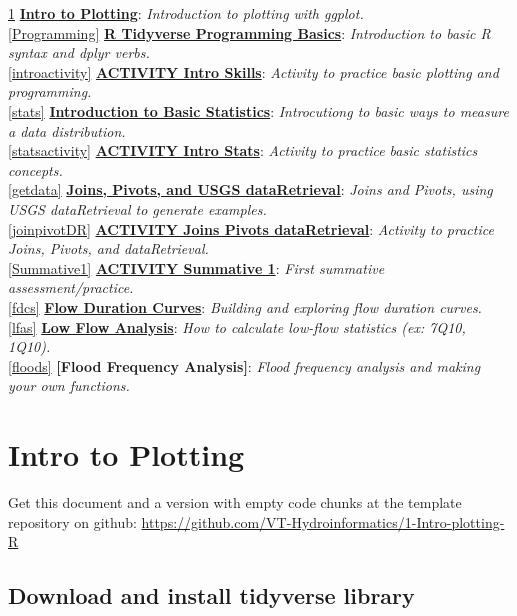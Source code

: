 \documentclass[
]{book}
\begin{document}
\ref{Plotting} \textbf{\protect\hyperlink{Plotting}{Intro to Plotting}}: \emph{Introduction to plotting with ggplot.}\\
\ref{Programming} \textbf{\protect\hyperlink{Programming}{R Tidyverse Programming Basics}}: \emph{Introduction to basic R syntax and dplyr verbs.}\\
\ref{introactivity} \textbf{\protect\hyperlink{introactivity}{ACTIVITY Intro Skills}}: \emph{Activity to practice basic plotting and programming.}\\
\ref{stats} \textbf{\protect\hyperlink{stats}{Introduction to Basic Statistics}}: \emph{Introcutiong to basic ways to measure a data distribution.}\\
\ref{statsactivity} \textbf{\protect\hyperlink{statsactivity}{ACTIVITY Intro Stats}}: \emph{Activity to practice basic statistics concepts.}\\
\ref{getdata} \textbf{\protect\hyperlink{getdata}{Joins, Pivots, and USGS dataRetrieval}}: \emph{Joins and Pivots, using USGS dataRetrieval to generate examples.}\\
\ref{joinpivotDR} \textbf{\protect\hyperlink{joinpivotDR}{ACTIVITY Joins Pivots dataRetrieval}}: \emph{Activity to practice Joins, Pivots, and dataRetrieval.}\\
\ref{Summative1} \textbf{\protect\hyperlink{Summative1}{ACTIVITY Summative 1}}: \emph{First summative assessment/practice.}\\
\ref{fdcs} \textbf{\protect\hyperlink{fdcs}{Flow Duration Curves}}: \emph{Building and exploring flow duration curves.}\\
\ref{lfas} \textbf{\protect\hyperlink{lfas}{Low Flow Analysis}}: \emph{How to calculate low-flow statistics (ex: 7Q10, 1Q10).}\\
\ref{floods} \textbf{{[}Flood Frequency Analysis{]}}: \emph{Flood frequency analysis and making your own functions.}

\hypertarget{Plotting}{%
\chapter{Intro to Plotting}\label{Plotting}}

Get this document and a version with empty code chunks at the template repository on github: \url{https://github.com/VT-Hydroinformatics/1-Intro-plotting-R}

\hypertarget{download-and-install-tidyverse-library}{%
\section{Download and install tidyverse library}\label{download-and-install-tidyverse-library}}
\end{document}
